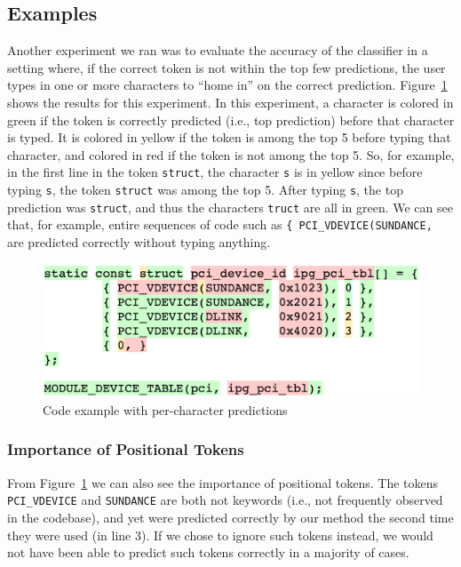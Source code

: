 \subsection{Examples}
\label{sec:examples}
Another experiment we ran was to evaluate the accuracy of the classifier in a
setting where, if the correct token is not within the top few predictions, the
user types in one or more characters to ``home in'' on the correct prediction.
Figure~\ref{fig:codeexample} shows the results for this experiment. In this
experiment, a character is colored in green if the token is correctly predicted
(i.e., top prediction) before that character is typed. It is colored in yellow
if the token is among the top 5 before typing that character, and colored in red
if the token is not among the top 5. So, for example, in the first line in the
token
{\tt struct}, the character {\tt s} is in yellow since before typing {\tt s}, the
token {\tt struct} was among the top 5. After typing {\tt s}, the top prediction
was {\tt struct}, and thus the characters {\tt truct} are all in green. We
can see that, for example, entire sequences of code such as {\tt \{
PCI\_VDEVICE(SUNDANCE, } are predicted correctly without typing anything.
\begin{figure}[h]
  \centering
  \includegraphics[width=\linewidth]{figs/example3.png}
  \caption{Code example with per-character predictions}
  \label{fig:codeexample}
\end{figure}

\subsubsection{Importance of Positional Tokens}
From Figure~\ref{fig:codeexample} we can also see the importance of positional
tokens. The tokens {\tt PCI\_VDEVICE} and {\tt SUNDANCE} are both not keywords
(i.e., not frequently observed in the codebase), and yet were predicted
correctly by our method the second time they were used (in line 3). If we chose
to ignore such tokens instead, we would not have been able to predict such
tokens correctly in a majority of cases.

